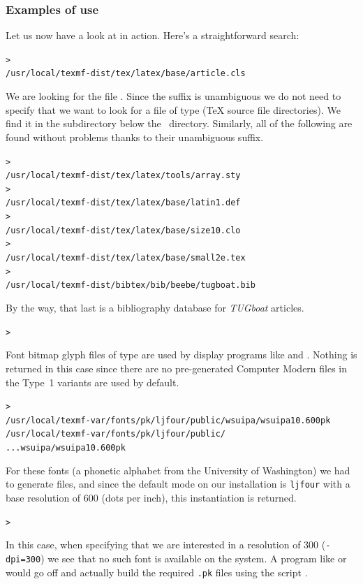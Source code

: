 \documentclass[12pt]{article}
\begin{document}
\subsubsection{Examples of use}
\label{sec:examples-of-use}

Let us now have a look at \KPS{} in action.  Here's a straightforward search:

\begin{alltt}
> 
   /usr/local/texmf-dist/tex/latex/base/article.cls
\end{alltt}
We are looking for the file . Since the 
suffix is unambiguous we do not need to specify that we want to look for a
file of type  (\TeX{} source file directories). We find it in
the subdirectory  below the  \TL\
directory.  Similarly, all of the following are found without problems
thanks to their unambiguous suffix.
\begin{alltt}
> 
   /usr/local/texmf-dist/tex/latex/tools/array.sty
> 
   /usr/local/texmf-dist/tex/latex/base/latin1.def
> 
   /usr/local/texmf-dist/tex/latex/base/size10.clo
> 
   /usr/local/texmf-dist/tex/latex/base/small2e.tex
> 
   /usr/local/texmf-dist/bibtex/bib/beebe/tugboat.bib
\end{alltt}

By the way, that last is a \BibTeX{} bibliography database for
\textsl{TUGboat} articles.

\begin{alltt}
> 
\end{alltt}
Font bitmap glyph files of type  are used by display
programs like  and .  Nothing is returned in
this case since there are no pre-generated Computer Modern \samp{.pk}
files in \TL{}\Dash the Type~1 variants are used by default.
\begin{alltt}
> 
\ifSingleColumn   /usr/local/texmf-var/fonts/pk/ljfour/public/wsuipa/wsuipa10.600pk
\else /usr/local/texmf-var/fonts/pk/ljfour/public/
...                         wsuipa/wsuipa10.600pk
\fi\end{alltt}
For these fonts (a phonetic alphabet from the University of Washington)
we had to generate \samp{.pk} files, and since the default \MF{} mode on
our installation is \texttt{ljfour} with a base resolution of 600\dpi{}
(dots per inch), this instantiation is returned.
\begin{alltt}
> 
\end{alltt}
In this case, when specifying that we are interested in a resolution
of 300\dpi{} (\texttt{-dpi=300}) we see that no such font is available on
the system. A program like \cmdname{dvips} or \cmdname{xdvi} would
go off and actually build the required \texttt{.pk} files
using the script .
\end{document}
